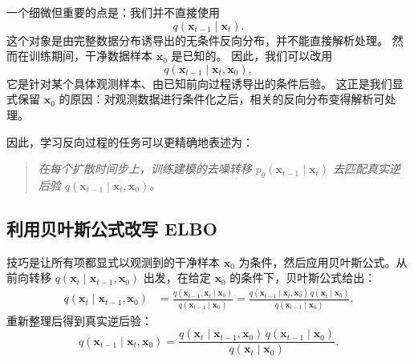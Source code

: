 一个细微但重要的点是：我们并不直接使用
\[
q(\mathbf{x}_{t-1}\mid \mathbf{x}_t).
\]
这个对象是由完整数据分布诱导出的无条件反向分布，并不能直接解析处理。
然而在训练期间，干净数据样本 $\mathbf{x}_0$ 是已知的。
因此，我们可以改用
\[
q(\mathbf{x}_{t-1}\mid \mathbf{x}_t,\mathbf{x}_0),
\]
它是针对某个具体观测样本、由已知前向过程诱导出的条件后验。
这正是我们显式保留 $\mathbf{x}_0$ 的原因：对观测数据进行条件化之后，相关的反向分布变得解析可处理。

因此，学习反向过程的任务可以更精确地表述为：
\begin{quote}
\emph{在每个扩散时间步上，训练建模的去噪转移
$p_\theta(\mathbf{x}_{t-1}\mid \mathbf{x}_t)$
去匹配真实逆后验
$q(\mathbf{x}_{t-1}\mid \mathbf{x}_t,\mathbf{x}_0)$。}
\end{quote}

\subsection{利用贝叶斯公式改写 ELBO}\begin{tcolorbox}[
  colback=blue!6,
  colframe=blue!55!black,
  title={显式得到真实逆后验的一个实用技巧},
  boxrule=0.8pt,
  arc=2mm,
  left=2mm,
  right=2mm,
  top=1mm,
  bottom=1mm
]
技巧是让所有项都显式以观测到的干净样本 $\mathbf{x}_0$ 为条件，然后应用贝叶斯公式。从前向转移
$q(\mathbf{x}_t\mid \mathbf{x}_{t-1},\mathbf{x}_0)$ 出发，在给定 $\mathbf{x}_0$ 的条件下，贝叶斯公式给出：
\[
\begin{aligned}
q(\mathbf{x}_t\mid \mathbf{x}_{t-1},\mathbf{x}_0)
&=
\frac{
q(\mathbf{x}_{t-1},\mathbf{x}_t\mid \mathbf{x}_0)
}{
q(\mathbf{x}_{t-1}\mid \mathbf{x}_0)
}=
\frac{
q(\mathbf{x}_{t-1}\mid \mathbf{x}_t,\mathbf{x}_0)\,
q(\mathbf{x}_t\mid \mathbf{x}_0)
}{
q(\mathbf{x}_{t-1}\mid \mathbf{x}_0)
}.
\end{aligned}
\]
重新整理后得到真实逆后验：
\[
q(\mathbf{x}_{t-1}\mid \mathbf{x}_t,\mathbf{x}_0)
=
\frac{
q(\mathbf{x}_t\mid \mathbf{x}_{t-1},\mathbf{x}_0)\,
q(\mathbf{x}_{t-1}\mid \mathbf{x}_0)
}{
q(\mathbf{x}_t\mid \mathbf{x}_0)
}.
\]
\end{tcolorbox}

